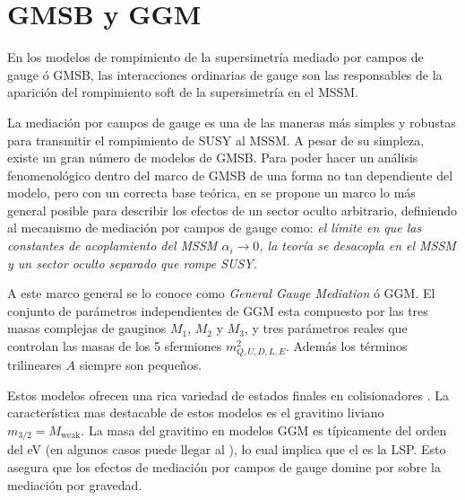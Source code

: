 \section{GMSB y GGM} %

En los modelos de rompimiento de la supersimetría mediado por campos de gauge ó
GMSB, las interacciones ordinarias de gauge son las responsables de la aparición
del rompimiento soft de la supersimetría en el MSSM.


La mediación por campos de gauge es una de las maneras más simples y robustas
para transmitir el rompimiento de SUSY al MSSM. A pesar de su simpleza, existe
un gran número de modelos de GMSB. Para poder hacer un análisis fenomenológico
dentro del marco de GMSB de una forma no tan dependiente del modelo, pero con un
correcta base teórica, en \cite{GGM} se propone un marco lo más general posible
para describir los efectos de un sector oculto arbitrario, definiendo al
mecanismo de mediación por campos de gauge como: \emph{el límite en que las
  constantes de acoplamiento del MSSM $\alpha_i \to 0$, la teoría se desacopla
  en el MSSM y un sector oculto separado que rompe SUSY.}

A este marco general se lo conoce como \emph{General Gauge Mediation} ó GGM. El
conjunto de parámetros independientes de GGM esta compuesto por las tres masas
complejas de gauginos $M_1$, $M_2$ y $M_3$, y tres parámetros reales que
controlan las masas de los 5 sfermiones $m^2_{Q,U,D,L,E}$. Además los términos
trilineares $A$ siempre son pequeños.

Estos modelos ofrecen una rica variedad de estados finales en colisionadores
\cite{0911.4130}. La característica mas destacable de estos modelos es el
gravitino liviano $m_{3/2} = M_\text{weak}$. La masa del gravitino en modelos
GGM es típicamente del orden del eV (en algunos casos puede llegar al \gev), lo
cual implica que el {\gravino} es la LSP. Esto asegura que los efectos de
mediación por campos de gauge domine por sobre la mediación por gravedad.

